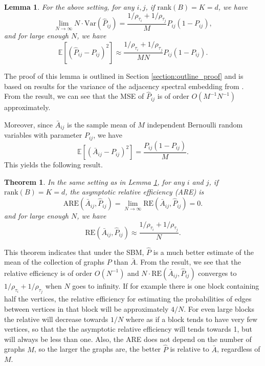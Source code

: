 \documentclass[10pt,letterpaper]{article}
\newtheorem{lemma}[fact]{Lemma}
\newtheorem{theorem}[fact]{Theorem}
\newcommand{\Ex}{\mathbb{E}}
\begin{document}
\begin{lemma}
\label{lm:VarPhat}
For the above setting, for any $i, j$, if $\mathrm{rank}(B)=K=d$, we have
\[
    \lim_{N \to \infty} N \cdot \mathrm{Var}(\hat{P}_{ij}) =
    \frac{1/\rho_{\tau_i} + 1/\rho_{\tau_j}}{M} P_{ij} (1 - P_{ij}),
\]
and for large enough $N$, we have
\[
    \Ex[(\hat{P}_{ij} - P_{ij})^2] \approx
    \frac{1/\rho_{\tau_i} + 1/\rho_{\tau_j}}{M N} P_{ij}(1-P_{ij}).
\]
\end{lemma}

The proof of this lemma is outlined in Section \ref{section:outline_proof} and is based on results for the variance of the adjacency spectral embedding from \citet{athreya2013limit}. From the result, we can see that the MSE of $\hat{P}_{ij}$ is of order $O(M^{-1}N^{-1})$ approximately.

Moreover, since $\bar{A}_{ij}$ is the sample mean of $M$ independent Bernoulli random variables with parameter $P_{ij}$, we have
\[
    \Ex[(\bar{A}_{ij} - P_{ij})^2] = \frac{P_{ij}(1-P_{ij})}{M}.
\]
This yields the following result.
\begin{theorem}
\label{thm:ARE}
In the same setting as in Lemma \ref{lm:VarPhat}, for any $i$ and $j$, if $\mathrm{rank}(B)=K=d$, the asymptotic relative efficiency (ARE) is 
\[
    \mathrm{ARE}(\bar{A}_{ij}, \hat{P}_{ij}) = \lim_{N \to \infty} \mathrm{RE}(\bar{A}_{ij}, \hat{P}_{ij}) = 0.
\]
and for large enough $N$, we have
\[
    \mathrm{RE}(\bar{A}_{ij}, \hat{P}_{ij}) \approx
    \frac{1/\rho_{\tau_i} + 1/\rho_{\tau_j}}{N}.
\]
\end{theorem}


This theorem indicates that under the SBM, $\hat{P}$ is a much better estimate of the mean of the collection of graphs $P$ than $\bar{A}$. 
From the result, we see that the relative efficiency is of order $O(N^{-1})$ and $N \cdot \mathrm{RE}(\bar{A}_{ij}, \hat{P}_{ij})$ converges to $1/\rho_{\tau_i}+1/\rho_{\tau_j}$ when $N$ goes to infinity.
If for example there is one block containing half the vertices, the relative efficiency for estimating the probabilities of edges between vertices in that block will be approximately $4/N$.
For even large blocks the relative will decrease towards $1/N$ where as if a block tends to have very few vertices, so that the the asymptotic relative efficiency will tends towards 1, but will always be less than one.
Also, the ARE does not depend on the number of graphs $M$, so the larger the graphs are, the better $\hat{P}$ is relative to $\bar{A}$, regardless of $M$.
\end{document}
